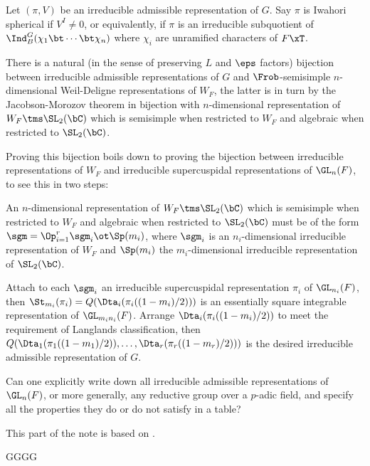 \documentclass[a4paper, twoside]{article}
\begin{document}
\begin{thm}[{\cite[9.12, 9.15]{PR2008}}]
	Let $(\pi,V)$ be an irreducible admissible representation of $G$. Say $\pi$ is Iwahori spherical if $V^{I}\neq0$, or equivalently, if $\pi$ is an irreducible subquotient of $\Ind_{B}^{G}(\chi_{1}\bt\cdots\bt\chi_{n})$ where $\chi_{i}$ are unramified characters of $F\xT$.
\end{thm}


\begin{thm}
	There is a natural (in the sense of preserving $L$ and $\eps$ factors) bijection between irreducible admissible representations of $G$ and $\Frob$-semisimple $n$-dimensional Weil-Deligne representations of $W_{F}$, the latter is in turn by the Jacobson-Morozov theorem in bijection with $n$-dimensional representation of $W_{F}\tms\SL_{2}(\bC)$ which is semisimple when restricted to $W_{F}$ and algebraic when restricted to $\SL_{2}(\bC)$.
\end{thm}

\begin{rmk}
	Proving this bijection boils down to proving the bijection between irreducible representations of $W_{F}$ and irreducible supercuspidal representations of $\GL_{n}(F)$, to see this in two steps:
	\begin{enr}
		\item An $n$-dimensional representation of $W_{F}\tms\SL_{2}(\bC)$ which is semisimple when restricted to $W_{F}$ and algebraic when restricted to $\SL_{2}(\bC)$ must be of the form $\sgm=\Op_{i=1}^{r}\sgm_{i}\ot\Sp(m_{i})$, where $\sgm_{i}$ is an $n_{i}$-dimensional irreducible representation of $W_{F}$ and $\Sp(m_{i})$ the $m_{i}$-dimensional irreducible representation of $\SL_{2}(\bC)$.
		\item Attach to each $\sgm_{i}$ an irreducible supercuspidal representation $\pi_{i}$ of $\GL_{n_{i}}(F)$, then $\St_{m_{i}}(\pi_{i})=Q(\Dta_{i}(\pi_{i}((1-m_{i})/2)))$ is an essentially square integrable representation of $\GL_{m_{i}n_{i}}(F)$. Arrange $\Dta_{i}(\pi_{i}((1-m_{i})/2))$ to meet the requirement of Langlands classification, then $Q(\Dta_{1}(\pi_{1}((1-m_{1})/2)),\ldots,\Dta_{r}(\pi_{r}((1-m_{r})/2)))$ is the desired irreducible admissible representation of $G$.
	\end{enr}
\end{rmk}


Can one explicitly write down all irreducible admissible representations of $\GL_{n}(F)$, or more generally, any reductive group over a $p$-adic field, and specify all the properties they do or do not satisfy in a table?



This part of the note is based on \cite{Prasad1993}.


GGGG






\end{document}
